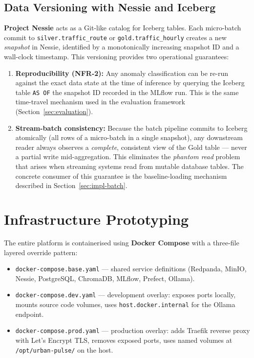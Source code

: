\subsection{Data Versioning with Nessie and Iceberg}

\textbf{Project Nessie} acts as a Git-like catalog for Iceberg tables.
Each micro-batch commit to \texttt{silver.traffic\_route} or
\texttt{gold.traffic\_hourly} creates a new \textit{snapshot} in Nessie,
identified by a monotonically increasing snapshot ID and a wall-clock
timestamp. This versioning provides two operational guarantees:

\begin{enumerate}
  \item \textbf{Reproducibility (NFR-2):} Any anomaly classification can
        be re-run against the exact data state at the time of inference by
        querying the Iceberg table \texttt{AS OF} the snapshot ID recorded
        in the MLflow run. This is the same time-travel mechanism used in
        the evaluation framework (Section~\ref{sec:evaluation}).

  \item \textbf{Stream-batch consistency:} Because the batch pipeline
        commits to Iceberg atomically (all rows of a micro-batch in a
        single snapshot), any downstream reader always observes a
        \textit{complete}, consistent view of the Gold table --- never a
        partial write mid-aggregation. This eliminates the
        \textit{phantom read} problem that arises when streaming systems
        read from mutable database tables. The concrete consumer of this
        guarantee is the baseline-loading mechanism described in
        Section~\ref{sec:impl-batch}.
\end{enumerate}

\section{Infrastructure Prototyping}
\label{sec:infra-proto}

The entire platform is containerised using \textbf{Docker Compose} with a
three-file layered override pattern:

\begin{itemize}
  \item \texttt{docker-compose\allowbreak.base.yaml} --- shared service definitions
        (Redpanda, MinIO, Nessie, PostgreSQL, ChromaDB, MLflow, Prefect, Ollama).
  \item \texttt{docker-compose\allowbreak.dev.yaml} --- development overlay: exposes ports
        locally, mounts source code volumes, uses \texttt{host.docker.internal}
        for the Ollama endpoint.
  \item \texttt{docker-compose\allowbreak.prod.yaml} --- production overlay: adds
        Traefik reverse proxy with Let's Encrypt TLS, removes exposed ports,
        uses named volumes at \texttt{/opt/urban-pulse/} on the host.
\end{itemize}

